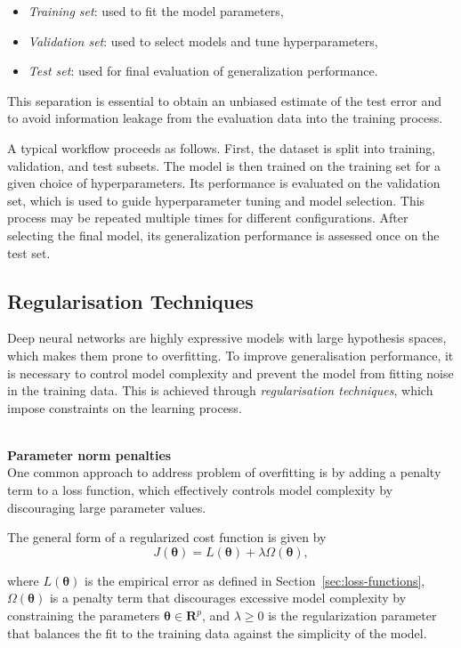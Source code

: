 \begin{itemize}
    \item \emph{Training set}: used to fit the model parameters,
    \item \emph{Validation set}: used to select models and tune hyperparameters,
    \item \emph{Test set}: used for final evaluation of generalization performance.
\end{itemize}

This separation is essential to obtain an unbiased estimate of the test error and to avoid information leakage from the evaluation data into the training process.

A typical workflow proceeds as follows. First, the dataset is split into training, validation, and test subsets. The model is then trained on the training set for a given choice of hyperparameters. Its performance is evaluated on the validation set, which is used to guide hyperparameter tuning and model selection. This process may be repeated multiple times for different configurations. After selecting the final model, its generalization performance is assessed once on the test set. 

\subsection{Regularisation Techniques}
Deep neural networks are highly expressive models with large hypothesis spaces, which makes them prone to overfitting. To improve generalisation performance, it is necessary to control model complexity and prevent the model from fitting noise in the training data. This is achieved through \emph{regularisation techniques}, which impose constraints on the learning process.

\textbf{\\Parameter norm penalties\\}
One common approach to address problem of overfitting is by adding a penalty term to a loss function, which effectively controls model complexity by discouraging large parameter values.

The general form of a regularized cost function is given by
\begin{equation*}
J(\boldsymbol{\theta}) = L(\boldsymbol{\theta}) + \lambda \Omega(\boldsymbol{\theta}),
\end{equation*}

where $L(\boldsymbol{\theta})$ is the empirical error as defined in Section~\ref{sec:loss-functions}, $\Omega(\boldsymbol{\theta})$ is a penalty term that discourages excessive model complexity by constraining the parameters $\boldsymbol{\theta}  \in \mathbf{R}^p$, and $\lambda \geq 0$ is the regularization parameter that balances the fit to the training data against the simplicity of the model.

